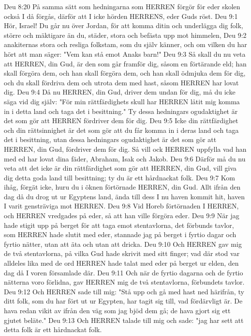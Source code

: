 Deu 8:20  På samma sätt som hedningarna som HERREN förgör för eder skolen också I då förgås, därför att I icke hörden HERRENS, eder Guds röst.
Deu 9:1  Hör, Israel! Du går nu över Jordan, för att komma ditin och underlägga dig folk, större och mäktigare än du, städer, stora och befästa upp mot himmelen,
Deu 9:2  anakiternas stora och resliga folkstam, som du själv känner, och om vilken du har hört att man säger: "Vem kan stå emot Anaks barn!"
Deu 9:3  Så skall du nu veta att HERREN, din Gud, är den som går framför dig, såsom en förtärande eld; han skall förgöra dem, och han skall förgöra dem, och han skall ödmjuka dem för dig, och du skall fördriva dem och utrota dem med hast, såsom HERREN har lovat dig.
Deu 9:4  Då nu HERREN, din Gud, driver dem undan för dig, må du icke säga vid dig själv: "För min rättfärdighets skull har HERREN låtit mig komma in i detta land och taga det i besittning." Ty dessa hedningars ogudaktighet är det som gör att HERREN fördriver dem för dig.
Deu 9:5  Icke din rättfärdighet och din rättsinnighet är det som gör att du får komma in i deras land och taga det i besittning, utan dessa hedningars ogudaktighet är det som gör att HERREN, din Gud, fördriver dem för dig. Så vill ock HERREN uppfylla vad han med ed har lovat dina fäder, Abraham, Isak och Jakob.
Deu 9:6  Därför må du nu veta att det icke är din rättfärdighet som gör att HERREN, din Gud, vill giva dig detta goda land till besittning; ty du är ett hårdnackat folk.
Deu 9:7  Kom ihåg, förgät icke, huru du i öknen förtörnade HERREN, din Gud. Allt ifrån den dag då du drog ut ur Egyptens land, ända till dess I nu haven kommit hit, haven I varit gensträviga mot HERREN.
Deu 9:8  Vid Horeb förtörnaden I HERREN, och HERREN vredgades på eder, så att han ville förgöra eder.
Deu 9:9  När jag hade stigit upp på berget för att taga emot stentavlorna, det förbunds tavlor, som HERREN hade slutit med eder, stannade jag på berget i fyrtio dagar och fyrtio nätter, utan att äta och utan att dricka.
Deu 9:10  Och HERREN gav mig de två stentavlorna, på vilka Gud hade skrivit med sitt finger; vad där stod var alldeles lika med de ord HERREN hade talat med eder på berget ur elden, den dag då I voren församlade där.
Deu 9:11  Och när de fyrtio dagarna och de fyrtio nätterna voro förlidna, gav HERREN mig de två stentavlorna, förbundets tavlor.
Deu 9:12  Och HERREN sade till mig: "Stå upp och gå med hast ned härifrån, ty ditt folk, som du har fört ut ur Egypten, har tagit sig till, vad fördärvligt är. De hava redan vikit av ifrån den väg som jag bjöd dem gå; de hava gjort sig ett gjutet beläte."
Deu 9:13  Och HERREN talade till mig och sade: "jag har sett att detta folk är ett hårdnackat folk.
